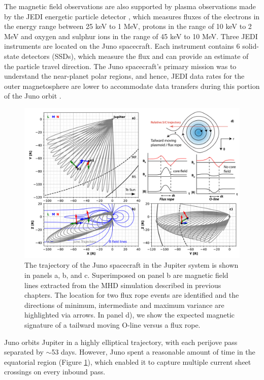 The magnetic field observations are also supported by plasma observations made by the JEDI energetic particle detector \cite{Mauk2017TheMission}, which measures fluxes of the electrons in the energy range between 25 keV to 1 MeV, protons in the range of 10 keV to 2 MeV and oxygen and sulphur ions in the range of 45 keV to 10 MeV. Three JEDI instruments are located on the Juno spacecraft. Each instrument contains 6 solid-state detectors (SSDs), which measure the flux and can provide an estimate of the particle travel direction. The Juno spacecraft's primary mission was to understand the near-planet polar regions, and hence, JEDI data rates for the outer magnetosphere are lower to accommodate data transfers during this portion of the Juno orbit \cite{Mauk2017TheMission}.  

\begin{figure}
    \centering
    \includegraphics[width=\textwidth]{images5/locations-fluxropes.jpg}
    \caption{The trajectory of the Juno spacecraft in the Jupiter system is shown in panels a, b, and c. Superimposed on panel b are magnetic field lines extracted from the MHD simulation described in previous chapters. The location for two flux rope events are identified and the directions of minimum, intermediate and maximum variance are highlighted via arrows. In panel d), we show the expected magnetic signature of a tailward moving O-line versus a flux rope.}
    \label{fig:locations-fluxropes-eg}
\end{figure}

Juno orbits Jupiter in a highly elliptical trajectory, with each perijove pass separated by $\sim$53 days. However, Juno spent a reasonable amount of time in the equatorial region (Figure \ref{fig:locations-fluxropes-eg}), which enabled it to capture multiple current sheet crossings on every inbound pass. 

